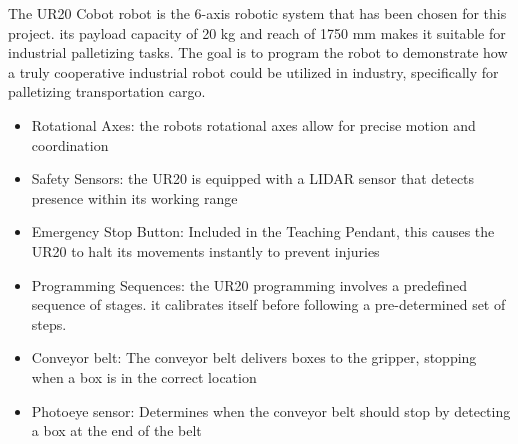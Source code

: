 The UR20 Cobot robot is the 6-axis robotic system that has been chosen for this project. its payload capacity of 20 kg and reach of 1750 mm makes it suitable for industrial palletizing tasks. The goal is to program the robot to demonstrate how a truly cooperative industrial robot could be utilized in industry, specifically for palletizing transportation cargo.

\begin{itemize}
    \item Rotational Axes: the robots rotational axes allow for precise motion and coordination
    \item Safety Sensors: the UR20 is equipped with a LIDAR sensor that detects presence within its working range
    \item Emergency Stop Button: Included in the Teaching Pendant, this causes the UR20 to halt its movements instantly to prevent injuries
    \item Programming Sequences: the UR20 programming involves a predefined sequence of stages. it calibrates itself before following a pre-determined set of steps.
    \item Conveyor belt: The conveyor belt delivers boxes to the gripper, stopping when a box is in the correct location
    \item Photoeye sensor: Determines when the conveyor belt should stop by detecting a box at the end of the belt
\end{itemize}
